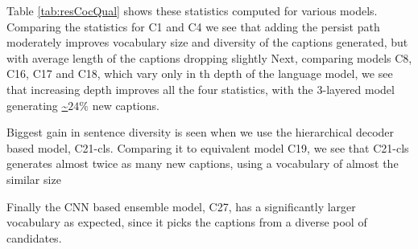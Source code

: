 Table \ref{tab:resCocQual} shows these statistics computed for various
models. 
Comparing the statistics for C1 and C4 we see that adding the persist path
moderately improves vocabulary size and diversity of the captions generated,
but with average length of the captions dropping slightly
Next, comparing models C8, C16, C17 and C18, which vary only in th depth of the
language model, we see that increasing depth improves all the four statistics,
with the 3-layered model generating \url{~}$24\%$ new captions.

Biggest gain in sentence diversity is seen when we use the hierarchical decoder
based model, C21-cls. 
Comparing it to equivalent model C19, we see that C21-cls generates almost twice
as many new captions, using a vocabulary of almost the similar size

Finally the CNN based ensemble model, C27, has a significantly larger vocabulary
as expected, since it picks the captions from a diverse pool of candidates.

